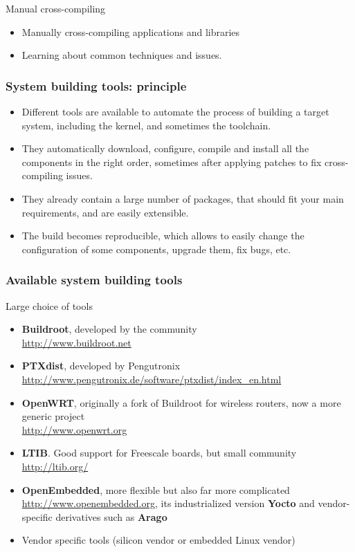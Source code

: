 \setuplabframe
{Manual cross-compiling}
{
  \begin{itemize}
  \item Manually cross-compiling applications and libraries
  \item Learning about common techniques and issues.
  \end{itemize}
}

\begin{frame}
  \frametitle{System building tools: principle}
  \begin{itemize}
  \item Different tools are available to automate the process of
    building a target system, including the kernel, and sometimes the
    toolchain.
  \item They automatically download, configure, compile and install
    all the components in the right order, sometimes after applying
    patches to fix cross-compiling issues.
  \item They already contain a large number of packages, that should
    fit your main requirements, and are easily extensible.
  \item The build becomes reproducible, which allows to easily change
    the configuration of some components, upgrade them, fix bugs, etc.
  \end{itemize}
\end{frame}

\begin{frame}
  \frametitle{Available system building tools} Large choice of tools
  \small
  \begin{itemize}
  \item {\bf Buildroot}, developed by the community\\
    \url{http://www.buildroot.net}
  \item {\bf PTXdist}, developed by Pengutronix\\
    \url{http://www.pengutronix.de/software/ptxdist/index_en.html}
  \item {\bf OpenWRT}, originally a fork of Buildroot for wireless routers,
    now a more generic project\\
    \url{http://www.openwrt.org}
  \item {\bf LTIB}. Good support for Freescale boards, but small community\\
    \url{http://ltib.org/}
  \item {\bf OpenEmbedded}, more flexible but also far more complicated\\
    \url{http://www.openembedded.org}, its industrialized version {\bf
      Yocto} and vendor-specific derivatives such as {\bf Arago}
  \item Vendor specific tools (silicon vendor or embedded Linux
    vendor)
  \end{itemize}
\end{frame}

